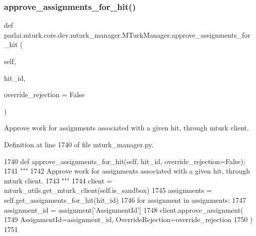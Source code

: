 \subsubsection{\texorpdfstring{approve\+\_\+assignments\+\_\+for\+\_\+hit()}{approve\_assignments\_for\_hit()}}
{\footnotesize\ttfamily def parlai.\+mturk.\+core.\+dev.\+mturk\+\_\+manager.\+M\+Turk\+Manager.\+approve\+\_\+assignments\+\_\+for\+\_\+hit (\begin{DoxyParamCaption}\item[{}]{self,  }\item[{}]{hit\+\_\+id,  }\item[{}]{override\+\_\+rejection = {\ttfamily False} }\end{DoxyParamCaption})}

\begin{DoxyVerb}Approve work for assignments associated with a given hit, through mturk client.
\end{DoxyVerb}
 

Definition at line 1740 of file mturk\+\_\+manager.\+py.


\begin{DoxyCode}
1740     \textcolor{keyword}{def }approve\_assignments\_for\_hit(self, hit\_id, override\_rejection=False):
1741         \textcolor{stringliteral}{"""}
1742 \textcolor{stringliteral}{        Approve work for assignments associated with a given hit, through mturk client.}
1743 \textcolor{stringliteral}{        """}
1744         client = mturk\_utils.get\_mturk\_client(self.is\_sandbox)
1745         assignments = self.get\_assignments\_for\_hit(hit\_id)
1746         \textcolor{keywordflow}{for} assignment \textcolor{keywordflow}{in} assignments:
1747             assignment\_id = assignment[\textcolor{stringliteral}{'AssignmentId'}]
1748             client.approve\_assignment(
1749                 AssignmentId=assignment\_id, OverrideRejection=override\_rejection
1750             )
1751 
\end{DoxyCode}
\mbox{\label{classparlai_1_1mturk_1_1core_1_1dev_1_1mturk__manager_1_1MTurkManager_a404ea4258642de992e96a9696519b662}} 
